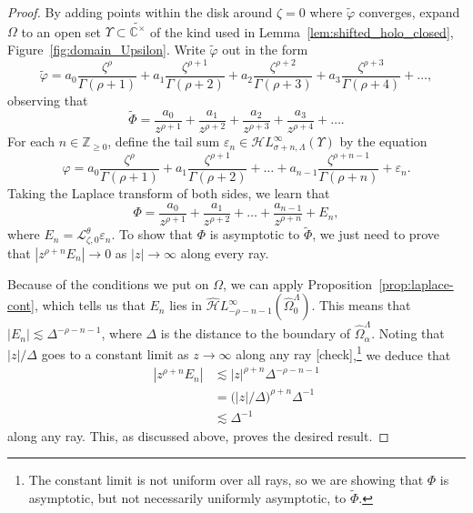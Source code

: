 \documentclass{article}
\newcommand{\singexp}[2]{\mathcal{H}L^\infty_{#1, #2}}
\newcommand{\dualsingexp}[1]{\widehat{\mathcal{H}}L^\infty_{#1}}
\newcommand{\Z}{\mathbb{Z}}
\newcommand{\C}{\mathbb{C}}
\newcommand{\series}[1]{\tilde{#1}}
\newcommand{\laplace}{\mathcal{L}}
\theoremstyle{definition}
\theoremstyle{plain}
\newenvironment{todo}{\color{Coral}}{\color{black}}
\newenvironment{draft}{\color{SlateBlue}}{\color{black}}
\begin{document}
\begin{proof}
By adding points within the disk around $\zeta = 0$ where $\series{\varphi}$ converges, expand $\Omega$ to an open set $\Upsilon \subset \widetilde{\C^\times}$ of the kind used in Lemma~\ref{lem:shifted_holo_closed}, Figure~\ref{fig:domain_Upsilon}. Write $\series{\varphi}$ out in the form
\[ \series{\varphi} = a_0 \frac{\zeta^\rho}{\Gamma(\rho+1)} + a_1 \frac{\zeta^{\rho+1}}{\Gamma(\rho+2)} + a_2 \frac{\zeta^{\rho+2}}{\Gamma(\rho+3)} + a_3 \frac{\zeta^{\rho+3}}{\Gamma(\rho+4)} + \ldots, \]
observing that
\[ \series{\Phi} = \frac{a_0}{z^{\rho+1}} + \frac{a_1}{z^{\rho+2}} + \frac{a_2}{z^{\rho+3}} + \frac{a_3}{z^{\rho+4}} + \ldots. \]
For each $n \in \Z_{\ge 0}$, define the tail sum $\varepsilon_n \in \singexp{\sigma+n}{\Lambda}(\Upsilon)$ by the equation
\[ \varphi = a_0 \frac{\zeta^\rho}{\Gamma(\rho+1)} + a_1 \frac{\zeta^{\rho+1}}{\Gamma(\rho+2)} + \ldots + a_{n-1} \frac{\zeta^{\rho+n-1}}{\Gamma(\rho+n)} + \varepsilon_n. \]
Taking the Laplace transform of both sides, we learn that
\[ \Phi = \frac{a_0}{z^{\rho+1}} + \frac{a_1}{z^{\rho+2}} + \ldots + \frac{a_{n-1}}{z^{\rho+n}} + E_n, \]
where $E_n = \laplace_{\zeta, 0}^\theta \varepsilon_n$. To show that $\Phi$ is asymptotic to $\series{\Phi}$, we just need to prove that $|z^{\rho+n} E_n| \to 0$ as $|z| \to \infty$ along every ray.

Because of the conditions we put on $\Omega$, we can apply Proposition~\ref{prop:laplace-cont}, which tells us that $E_n$ lies in $\dualsingexp{-\rho-n-1}(\widehat{\Omega}_0^\Lambda)$. This means that $|E_n| \lesssim \Delta^{-\rho-n-1}$, where $\Delta$ is the distance to the boundary of $\widehat{\Omega}_\alpha^\Lambda$. Noting that \begin{draft}$|z|/\Delta$ goes to a constant limit as $z \to \infty$ along any ray \begin{todo}[check]\end{todo}\end{draft},\footnote{The constant limit is not uniform over all rays, so we are showing that $\Phi$ is asymptotic, but not necessarily uniformly asymptotic, to $\series{\Phi}$.} we deduce that
\begin{align*}
|z^{\rho+n} E_n| & \lesssim |z|^{\rho+n} \Delta^{-\rho-n-1} \\
& = \big(|z|/\Delta\big)^{\rho+n} \Delta^{-1} \\
& \lesssim \Delta^{-1}
\end{align*}
along any ray. This, as discussed above, proves the desired result.
\end{proof}
\color{black}
\end{document}
